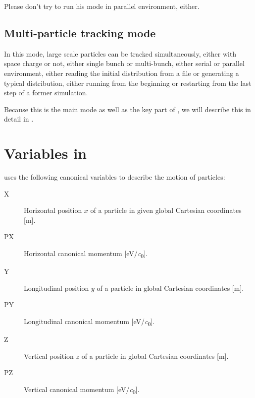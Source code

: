 Please don't try to run his mode in parallel environment, either.


\subsection{Multi-particle tracking mode}

  In this mode, large scale particles can be tracked simultaneously, either with space charge or not,
  either single bunch or multi-bunch, either serial or parallel environment,
  either reading the initial distribution from a file or generating a typical distribution,
  either running from the beginning or restarting from the last step of a former simulation.

  Because this is the main mode as well as the key part of \opalcycl,
  we will describe this in detail in .




\section{Variables in \opalcycl}
\label{sec:variablesopalcycl}

\label{sec:opalcycl:canon}

\opalcycl uses the following canonical variables to describe the motion of particles:

\begin{description}
\item[X]
  Horizontal position $x$ of a particle in given global Cartesian coordinates [\si{\meter}].

\item[PX]
  Horizontal canonical momentum [\si{\electronvolt/\clight}].

\item[Y]
  Longitudinal position $y$ of a particle in global Cartesian coordinates [\si{\meter}].

\item[PY]
  Longitudinal canonical momentum [\si{\electronvolt/\clight}].

\item[Z]
  Vertical position $z$ of a particle in global Cartesian coordinates [\si{\meter}].

\item[PZ]
  Vertical canonical momentum [\si{\electronvolt/\clight}].

\end{description}

